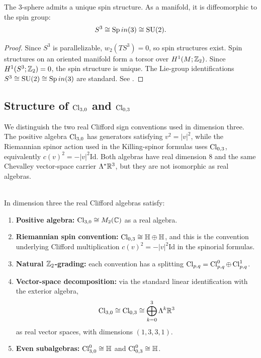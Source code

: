 \documentclass[11pt]{article}
\begin{document}
\begin{theorem}

\label{p1a:theorem:atlas-the-3-sphere-admits-a-unique-spin-structure-as-7608b1a}
The 3-sphere admits a unique spin structure. As a manifold, it is diffeomorphic to the spin group:
\[
S^3 \cong \operatorname{Sp}in(3) \cong \mathrm{SU}(2).
\]
\cite{lawson1989spin,helgason1984groups}
\end{theorem}

\begin{proof}
Since \(S^3\) is parallelizable, \(w_2(TS^3)=0\), so spin structures exist. Spin structures on an oriented manifold form a torsor over \(H^1(M;\mathbb{Z}_2)\). Since \(H^1(S^3;\mathbb{Z}_2)=0\), the spin structure is unique. The Lie-group identifications \(S^3\cong\mathrm{SU}(2)\cong\operatorname{Sp}in(3)\) are standard. See \cite{lawson1989spin,helgason1984groups}.
\end{proof}


\subsection{\texorpdfstring{Structure of $\operatorname{Cl}_{3,0}$ and $\operatorname{Cl}_{0,3}$}{Structure of Cl(3,0) and Cl(0,3)}}

We distinguish the two real Clifford sign conventions used in dimension three.
The positive algebra \(\operatorname{Cl}_{3,0}\) has generators satisfying \(v^2=|v|^2\), while the Riemannian spinor action used in the Killing-spinor formulas uses \(\operatorname{Cl}_{0,3}\), equivalently \(c(v)^2=-|v|^2\mathrm{Id}\).
Both algebras have real dimension \(8\) and the same Chevalley vector-space carrier \(\Lambda^*\mathbb{R}^3\), but they are not isomorphic as real algebras.

\begin{theorem}
\label{p1a:theorem:atlas-algebraic-structure-b08f94a}

\mbox{}\\[6pt]
In dimension three the real Clifford algebras satisfy:
\begin{enumerate}
    \item \textbf{Positive algebra:} \(\operatorname{Cl}_{3,0}\cong M_2(\mathbb{C})\) as a real algebra.
    \item \textbf{Riemannian spin convention:} \(\operatorname{Cl}_{0,3}\cong \mathbb{H}\oplus\mathbb{H}\), and this is the convention underlying Clifford multiplication \(c(v)^2=-|v|^2\mathrm{Id}\) in the spinorial formulas.
    \item \textbf{Natural \(\mathbb{Z}_2\)-grading:} each convention has a splitting \(\operatorname{Cl}_{p,q}=\operatorname{Cl}^0_{p,q}\oplus \operatorname{Cl}^1_{p,q}\).
    \item \textbf{Vector-space decomposition:} via the standard linear identification
    with the exterior algebra,
    \[
    \operatorname{Cl}_{3,0}\cong \operatorname{Cl}_{0,3}\cong \bigoplus_{k=0}^3 \Lambda^k\mathbb{R}^3
    \]
    as real vector spaces, with dimensions \((1,3,3,1)\).
    \item \textbf{Even subalgebras:} \(\operatorname{Cl}^0_{3,0}\cong\mathbb{H}\) and \(\operatorname{Cl}^0_{0,3}\cong\mathbb{H}\).
\end{enumerate}
\cite{lawson1989spin}
\end{theorem}
\end{document}
